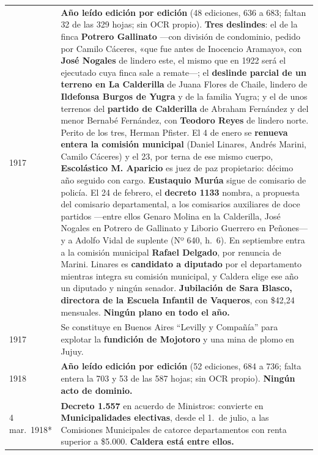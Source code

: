 \begin{longtable}{@{}p{2.7cm}p{10.3cm}@{}}
1917 & \textbf{Año leído edición por edición} (48 ediciones, 636 a 683; faltan 32 de las 329 hojas; sin OCR propio). \textbf{Tres deslindes}: el de la finca \textbf{Potrero Gallinato} ---con división de condominio, pedido por Camilo Cáceres, «que fue antes de Inocencio Aramayo», con \textbf{José Nogales} de lindero este, el mismo que en 1922 será el ejecutado cuya finca sale a remate---; el \textbf{deslinde parcial de un terreno en La Calderilla} de Juana Flores de Chaile, lindero de \textbf{Ildefonsa Burgos de Yugra} y de la familia Yugra; y el de unos terrenos del \textbf{partido de Calderilla} de Abraham Fernández y del menor Bernabé Fernández, con \textbf{Teodoro Reyes} de lindero norte. Perito de los tres, Herman Pfister\index{Pfister, Hermann}. El 4 de enero se \textbf{renueva entera la comisión municipal} (Daniel Linares\index{Linares, Daniel}, Andrés Marini, Camilo Cáceres) y el 23, por terna de ese mismo cuerpo, \textbf{Escolástico M. Aparicio}\index{Aparicio, Escolástico M.} es juez de paz propietario: décimo año seguido con cargo. \textbf{Eustaquio Murúa}\index{Murúa, Eustaquio} sigue de comisario de policía. El 24 de febrero, el \textbf{decreto 1133} nombra, a propuesta del comisario departamental, a los comisarios auxiliares de doce partidos ---entre ellos Genaro Molina en la Calderilla, José Nogales en Potrero de Gallinato y Liborio Guerrero\index{Guerrero, Liborio} en Peñones--- y a Adolfo Vidal de suplente (Nº 640, h.\ 6). En septiembre entra a la comisión municipal \textbf{Rafael Delgado}\index{Delgado, Rafael}, por renuncia de Marini. Linares es \textbf{candidato a diputado} por el departamento mientras integra su comisión municipal, y Caldera elige ese año un diputado y ningún senador. \textbf{Jubilación de Sara Blasco, directora de la Escuela Infantil de Vaqueros}, con \$42,24 mensuales. \textbf{Ningún plano en todo el año.} \\
1917 & Se constituye en Buenos Aires ``Levilly y Compañía'' para explotar la \textbf{fundición de Mojotoro} y una mina de plomo en Jujuy. \\
1918 & \textbf{Año leído edición por edición} (52 ediciones, 684 a 736; falta entera la 703 y 53 de las 587 hojas; sin OCR propio). \textbf{Ningún acto de dominio.} \\
4 mar.\ 1918* & \textbf{Decreto 1.557} en acuerdo de Ministros: convierte en \textbf{Municipalidades electivas}, desde el 1.\ de julio, a las Comisiones Municipales de catorce departamentos con renta superior a \$5.000. \textbf{Caldera está entre ellos.} \\

\end{longtable}
